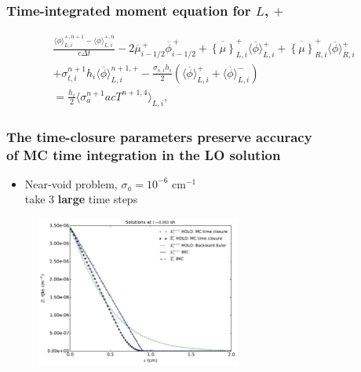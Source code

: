 \documentclass[xcolor=dvipsnames,hyperref={pdfpagelabels=false},unknownkeysallowed]{beamer}
\newcommand{\colb}[1]{{\color{blue} #1}}
\newcommand{\colG}[1]{{\color{Gray!110} #1}}
\newlength{\wideitemsep}
\let\olditem\item
\renewcommand{\item}{\setlength{\itemsep}{\wideitemsep}\olditem}
\newcommand{\mom}[1]{\langle #1 \rangle}
\newcommand{\cur}[1]{\left\{ #1 \right\}}
\newcommand{\phibar}{\ensuremath{\overline{\phi}}}
\begin{document}
\begin{frame}
    \frametitle{Time-integrated moment equation for $L$, $+$}
\begin{multline}\label{eq:t_moml_ex}
    \frac{\mom{\phi}_{L,i}^{+,n+1} - \mom{\phi}_{L,i}^{+,n}}{c \Delta t}
    -2\overline {\mu}_{i-1/2}^{\,+} \overline \phi_{i-1/2}^{\,+} + \overline{\cur {\mu}}_{L,i}^{+}
  \mom{\phibar}_{L,i}^{+}
  +  \overline{\cur\mu}_{R,i}^{+}
  \mom{\phibar}_{R,i}^{+}  \\ +   \sigma_{t,i}^{n+1} h_i 
  \mom{\overline\phi}_{L,i}^{n+1,+} -  \frac{\sigma_{s,i} h_i}{2} \left( \mom{\phibar}_{L,i}^{+} +
  \mom{\phibar}_{L,i}^{-}\right)  \\ = \frac{h_i}{2} \mom{\sigma_a^{n+1} a c T^{n+1,4}}_{L,i},
\end{multline}
\end{frame}


\begin{frame}
    \frametitle{The time-closure parameters preserve accuracy \\ of MC time integration in the LO solution}
    \begin{itemize}
        \item[] Near-void problem, $\sigma_a=10^{-6}$ cm$^{-1}$ \\ \colG{take 3
                \textbf{large} time steps}
    \end{itemize}
\begin{figure}[H]
  \centering
    \includegraphics[width=0.60\textwidth]{void_imc_compare.pdf}
\end{figure}

\end{frame}
\end{document}
